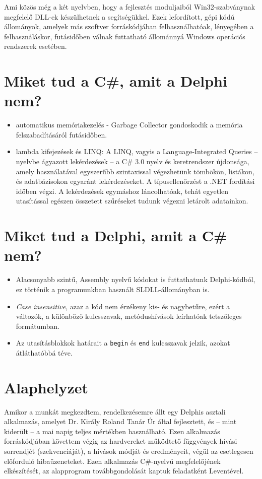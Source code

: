 \documentclass[tocnopagenum]{thesis-ekf}
\begin{document}
	Ami közös még a két nyelvben, hogy a fejlesztés moduljaiból Win32-szabványnak megfelelő DLL-ek készülhetnek a segítségükkel. Ezek lefordított, gépi kódú állományok, amelyek más szoftver forráskódjában felhasználhatóak, lényegében a felhasználáskor, futásidőben válnak futtatható állománnyá Windows operációs rendszerek esetében.
	
	\section{Miket tud a C\#, amit a Delphi nem?}
	\begin{itemize}
		\item automatikus memóriakezelés - Garbage Collector gondoskodik a memória felszabadításáról futásidőben.
		\item lambda kifejezések és LINQ: A LINQ, vagyis a Language-Integrated Queries -- nyelvbe ágyazott lekérdezések -- a C\# 3.0 nyelv és keretrendszer újdonsága, amely használatával egyszerűbb szintaxissal végezhetünk tömbökön, listákon, és adatbázisokon egyaránt lekérdezéseket. A típusellenőrzést a .NET fordítási időben végzi. A lekérdezések egymáshoz láncolhatóak, tehát egyetlen utasítással egészen összetett szűréseket tudunk végezni letárolt adatainkon. \cite{linq}
	\end{itemize}
	\section{Miket tud a Delphi, amit a C\# nem?}
	\begin{itemize}
		\item Alacsonyabb szintű, Assembly nyelvű kódokat is futtathatunk Delphi-kódból, ez történik a programunkban használt SLDLL-állományban is.
		\item \emph{Case insensitive}, azaz a kód nem érzékeny kis- és nagybetűre, ezért a változók, a különböző kulcsszavak, metódushívások leírhatóak tetszőleges formátumban.
		\item Az utasításblokkok határait a \verb*|begin| és \verb*|end| kulcsszavak jelzik, azokat átláthatóbbá téve.\cite{pascal_csharp}
	\end{itemize}
	\section{Alaphelyzet}
	Amikor a munkát megkezdtem, rendelkezésemre állt egy Delphis asztali alkalmazás, amelyet Dr. Király Roland Tanár Úr által fejlesztett, és -- mint kiderült -- a mai napig teljes mértékben használható. Ezen alkalmazás forráskódjában követtem végig az hardvereket működtető függvények hívási sorrendjét (szekvenciáját), a hívások módját és eredményeit, végül az esetlegesen előforduló hibaüzeneteket. 
	Ezen alkalmazás C\#-nyelvű megfelelőjének elkészítését, az alapprogram továbbgondolását kaptuk feladatként Leventével. 
	
\end{document}

